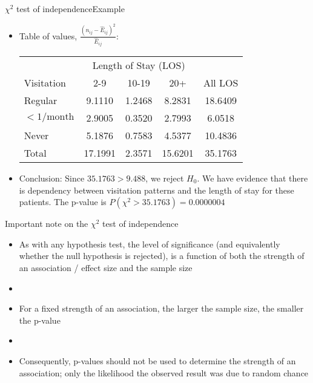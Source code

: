 \documentclass[xcolor=dvipsnames]{beamer}
\begin{document}
\begin{frame}{$\chi^2$ test of independence}{Example}
\begin{itemize}
	\item Table of values, $\frac{(n_{ij}-\hat{E}_{ij})^2}{\hat{E}_{ij}}$:
	\vspace{1mm}
	{\scriptsize
		\begin{center}
			\begin{tabular}{|l|ccc|c|}
				\hline
				& \multicolumn{3}{c|}{Length of Stay (LOS)} & \\
				Visitation & 2-9 & 10-19 & 20+ & All LOS \\ \hline
				Regular           &9.1110 &1.2468 &8.2831 & 18.6409\\
				$<1/\text{month}$ &2.9005 &0.3520 &2.7993 & 6.0518\\
				Never             &5.1876 &0.7583 &4.5377 & 10.4836\\ \hline
				Total & 17.1991 & 2.3571 &15.6201& 35.1763 \\ \hline
			\end{tabular}
	\end{center}}
	\vspace{2mm}
	\item Conclusion: Since $35.1763 > 9.488$, we reject $H_0$. We have evidence that there is dependency between visitation patterns and the length of stay for these patients. The p-value is $P(\chi^2 > 35.1763) =0.0000004$
\end{itemize}
\end{frame}

\begin{frame}{Important note on the $\chi^2$ test of independence}
	\begin{itemize}
		\item As with any hypothesis test, the level of significance (and equivalently whether the null hypothesis is rejected), is a function of both the strength of an association / effect size and the sample size
		\item[]
		\item For a fixed strength of an association, the larger the sample size, the smaller the p-value
		\item[]
		\item Consequently, p-values should not be used to determine the strength of an association; only the likelihood the observed result was due to random chance
	\end{itemize}
\end{frame}
\end{document}
